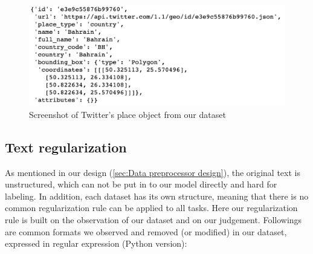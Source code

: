 \begin{figure}[!htbp]
    \centering
    \includegraphics[width=5in]{images/twitter_place.png}
    \caption{Screenshot of Twitter's place object from our dataset}
    \label{fig:twitter_place}
\end{figure}

\subsection{Text regularization}
As mentioned in our design (\ref{sec:Data preprocessor design}), the original text is unstructured, which can not be put in to our model directly and hard for labeling. In addition, each dataset has its own structure, meaning that there is no common regularization rule can be applied to all tasks. Here our regularization rule is built on the observation of our dataset and on our judgement. Followings are common formats we observed and removed (or modified) in our dataset, expressed in regular expression (Python version):
